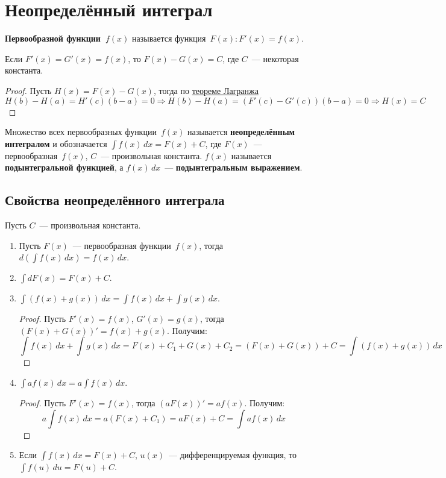 \section{Неопределённый интеграл}
 \textbf{Первообразной функции~$f(x)$} называется функция~$F(x) \colon F'(x) = f(x)$.

\begin{theorem}
Если $F'(x) = G'(x) = f(x)$, то $F(x) - G(x) = C$, где $C$~--- некоторая константа.
\end{theorem}
\begin{proof}
Пусть $H(x) = F(x) - G(x)$, тогда по \hyperref[th:mean_value]{теореме Лагранжа}
\begin{equation*}
H(b) - H(a) = H'(c)(b - a) = 0 \Rightarrow
H(b) - H(a) = (F'(c) - G'(c))(b - a) = 0 \Rightarrow
H(x) = C
\end{equation*}
\end{proof}

 Множество всех первообразных функции~$f(x)$ называется \textbf{неопределённым интегралом} и обозначается $\int f(x)\,dx = F(x) + C$, где $F(x)$~--- первообразная~$f(x)$, $C$~--- произвольная константа.
$f(x)$ называется \textbf{подынтегральной функцией}, а $f(x)\,dx$~--- \textbf{подынтегральным выражением}.

\subsection{Свойства неопределённого интеграла}
Пусть $C$~--- произвольная константа.
\begin{enumerate}
	\item Пусть $F(x)$~--- первообразная функции~$f(x)$, тогда $d \left( \int f(x)\,dx \right) = f(x)\,dx$.
	
	\item $\int dF(x) = F(x) + C$.
	
	\item $\int (f(x) + g(x))\,dx = \int f(x)\,dx + \int g(x)\,dx$.
	\begin{proof}
	Пусть $F'(x) = f(x)$, $G'(x) = g(x)$, тогда $(F(x) + G(x))' = f(x) + g(x)$.
	Получим:
	\begin{equation*}
	\int f(x)\,dx + \int g(x)\,dx = F(x) + C_1 + G(x) + C_2 = (F(x) + G(x)) + C = \int (f(x) + g(x))\,dx
	\end{equation*}
	\end{proof}
	
	\item $\int a f(x)\,dx = a \int f(x)\,dx$.
	\begin{proof}
	Пусть $F'(x) = f(x)$, тогда $(a F(x))' = a f(x)$.
	Получим:
	\begin{equation*}
	a \int f(x)\,dx = a(F(x) + C_1) = a F(x) + C = \int a f(x)\,dx
	\end{equation*}
	\end{proof}
	
	\item Если $\int f(x)\,dx = F(x) + C$, $u(x)$~--- дифференцируемая функция, то $\int f(u)\,du = F(u) + C$.
\end{enumerate}

